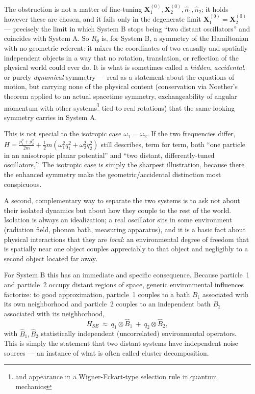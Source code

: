 The obstruction is not a matter of fine-tuning
$\mathbf{X}_1^{(0)},\mathbf{X}_2^{(0)},\hat n_1,\hat n_2$; it holds however
these are chosen, and it fails only in the degenerate limit
$\mathbf{X}_1^{(0)}=\mathbf{X}_2^{(0)}$ --- precisely the limit in which System
B stops being ``two distant oscillators'' and coincides with System A. So
$R_\theta$ is, for System B, a symmetry of the Hamiltonian with no geometric
referent: it mixes the coordinates of two causally and spatially independent
objects in a way that no rotation, translation, or reflection of the physical
world could ever do. It is what is sometimes called a \emph{hidden},
\emph{accidental}, or purely \emph{dynamical} symmetry --- real as a statement
about the equations of motion, but carrying none of the physical content
(conservation via Noether's theorem applied to an actual spacetime symmetry,
exchangeability of angular momentum with other systems\footnote{and appearance in a
Wigner-Eckart-type selection rule in quantum mechanics} tied to real rotations) 
that the same-looking
symmetry carries in System A.

\begin{remark}
This is not special to the isotropic case $\omega_1=\omega_2$. If the two
    frequencies differ, $H=\frac{p_1^2+p_2^2}{2m}+\frac12
    m(\omega_1^2q_1^2+\omega_2^2q_2^2)$ still describes, term for term, both
    ``one particle in an anisotropic planar potential'' and ``two distant,
    differently-tuned oscillators,''. The isotropic case is simply the 
    sharpest illustration, because
    there the enhanced symmetry make the geometric/accidental distinction most
    conspicuous.
\end{remark}

A second, complementary way to separate the two systems is to ask not about
their isolated dynamics but about how they couple to the rest of the world.
Isolation is always an idealization; a real oscillator sits in some environment
(radiation field, phonon bath, measuring apparatus), and it is a basic fact
about physical interactions that they are \emph{local}: an environmental degree
of freedom that is spatially near one object couples appreciably to that object
and negligibly to a second object located far away.

For System B this has an immediate and specific consequence. Because particle~1
and particle~2 occupy distant regions of space, generic environmental
influences factorize: to good approximation, particle~1 couples to a bath $B_1$
associated with its own neighborhood and particle~2 couples to an independent
bath $B_2$ associated with its neighborhood,
\begin{equation}
H_{SE}\ \approx\ q_1\otimes \hat B_1 \ +\ q_2\otimes \hat B_2 ,
\label{localcoupling}
\end{equation}
with $\hat B_1,\hat B_2$ statistically independent (uncorrelated) environmental
operators. This is simply the statement that two distant systems have
independent noise sources --- an instance of what is often called cluster
decomposition.

